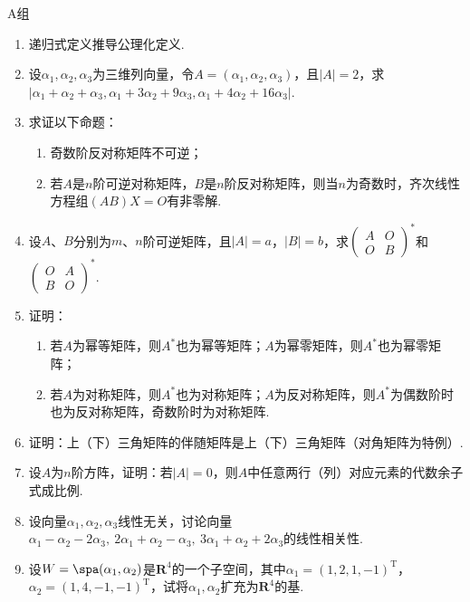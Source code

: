 \centerline{\heiti A组}
\begin{enumerate}
    \item 递归式定义推导公理化定义.

    \item 设$\alpha_1,\alpha_2,\alpha_3$为三维列向量，令$A=(\alpha_1,\alpha_2,\alpha_3)$，且$|A|=2$，求$|\alpha_1+\alpha_2+\alpha_3,\alpha_1+3\alpha_2+9\alpha_3,\alpha_1+4\alpha_2+16\alpha_3|$.

    \item 求证以下命题：
          \begin{enumerate}
              \item 奇数阶反对称矩阵不可逆；

              \item 若$A$是$n$阶可逆对称矩阵，$B$是$n$阶反对称矩阵，则当$n$为奇数时，齐次线性方程组$(AB)X=O$有非零解.
          \end{enumerate}

    \item 设$A$、$B$分别为$m$、$n$阶可逆矩阵，且$|A|=a$，$|B|=b$，求$\begin{pmatrix}
                  A & O \\ O & B
              \end{pmatrix}^*$和$\begin{pmatrix}
                  O & A \\ B & O
              \end{pmatrix}^*$.

    \item 证明：
          \begin{enumerate}
              \item 若$A$为幂等矩阵，则$A^*$也为幂等矩阵；$A$为幂零矩阵，则$A^*$也为幂零矩阵；

              \item 若$A$为对称矩阵，则$A^*$也为对称矩阵；$A$为反对称矩阵，则$A^*$为偶数阶时也为反对称矩阵，奇数阶时为对称矩阵.
          \end{enumerate}

    \item 证明：上（下）三角矩阵的伴随矩阵是上（下）三角矩阵（对角矩阵为特例）.

    \item 设$A$为$n$阶方阵，证明：若$|A|=0$，则$A$中任意两行（列）对应元素的代数余子式成比例.

    \item 设向量$\alpha_1,\alpha_2,\alpha_3$线性无关，讨论向量$\alpha_1-\alpha_2-2\alpha_3,\ 2\alpha_1+\alpha_2-\alpha_3,\ 3\alpha_1+\alpha_2+2\alpha_3$的线性相关性.

    \item 设$W=\spa(\alpha_1,\alpha_2)$是$\mathbf{R}^4$的一个子空间，其中$\alpha_1=(1,2,1,-1)^\mathrm{T}$，$\alpha_2=(1,4,-1,-1)^\mathrm{T}$，试将$\alpha_1,\alpha_2$扩充为$\mathbf{R}^4$的基.
\end{enumerate}

